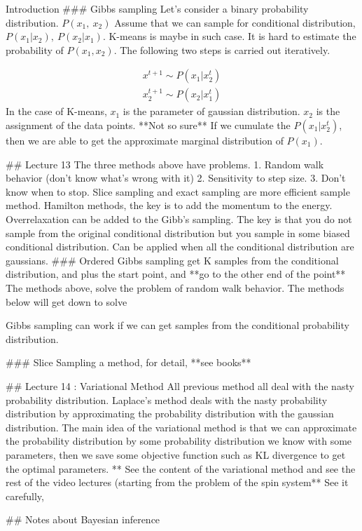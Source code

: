 \documentclass{beamer}
\begin{document}
\begin{frame}[allowframebreaks]{Introduction}
    ### Gibbs sampling
    Let's consider a binary probability distribution. $P( x_{1} ,\ x_{2})$
    Assume that we can sample for conditional distribution, $P( x_{1} |x_{2}) ,\ P( x_{2} |x_{1})$. K-means is maybe in such case. It is hard to estimate the probability of $P( x_{1} ,x_{2})$. 
    The following two steps is carried out iteratively. 
    
    \begin{gather*}
    x^{t+1} \sim P\left( x_{1} |x^{t}_{2}\right)\\
    x^{t+1}_{2} \sim P\left( x_{2} |x^{t}_{1}\right)
    \end{gather*}
    In the case of K-means, $x_{1}$ is the parameter of gaussian distribution. $x_{2}$ is the assignment of the data points. **Not so sure** If we cumulate the $P\left( x_{1} |x^{t}_{2}\right)$, then we are able to get the approximate marginal distribution of $P( x_{1})$.
    
    
    ## Lecture 13
    The three methods above have problems. 1. Random walk behavior (don't know what's wrong with it) 2. Sensitivity to step size. 3. Don't know when to stop. 
    Slice sampling and exact sampling are more efficient sample method. 
    Hamilton methods, the key is to add the momentum to the energy.
    Overrelaxation can be added to the Gibb's sampling. The key is that you do not sample from the original conditional distribution but you sample in some biased conditional distribution. Can be applied when all the conditional distribution are gaussians.
    ### Ordered Gibbs sampling 
    get K samples from the conditional distribution, and plus the start point, and **go to the other end of the point**
    The methods above, solve the problem of random walk behavior. 
    The methods below will get down to solve 
    
    Gibbs sampling can work if we can get samples from the conditional probability distribution.
    
    ### Slice Sampling
    a method, for detail, **see books**
    
    ## Lecture 14 : Variational Method
    All previous method all deal with the nasty probability distribution. 
    Laplace's method deals with the nasty probability distribution by approximating the probability distribution with the gaussian distribution.
    The main idea of the variational method is that we can approximate the probability distribution by some probability distribution we know with some parameters, then we save some objective function such as KL divergence to get the optimal parameters. 
    ** See the content of the variational method and see the rest of the video lectures (starting from the problem of the spin system** 
    See it carefully, 
    
    ## Notes about Bayesian inference
    
    
    

\end{frame}
\end{document}
